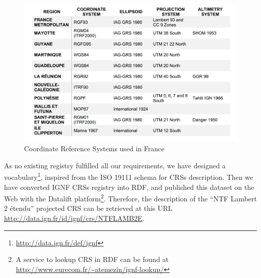 \begin{figure}[!htbp]
 \begin{center}
  \includegraphics[width=120mm]{img/crs-france.png}
  \caption{Coordinate Reference Systems used in France}%
  \label{fig:crsinfr}
 \end{center}
\end{figure}
 
As no existing registry fulfilled all our requirements, we have designed a vocabulary\footnote{\url{http://data.ign.fr/def/ignf}}, inspired from the ISO 19111 schema for CRSs description. Then we have converted IGNF CRSs registry into RDF, and published this dataset on the Web with the Datalift platform\footnote{A service to lookup CRS in RDF can be found at \url{http://www.eurecom.fr/~atemezin/ignf-lookup/}}. Therefore, the description of the ``NTF Lambert 2 \'{e}tendu'' projected CRS can be retrieved at this URL \url{http://data.ign.fr/id/ignf/crs/NTFLAMB2E}.


